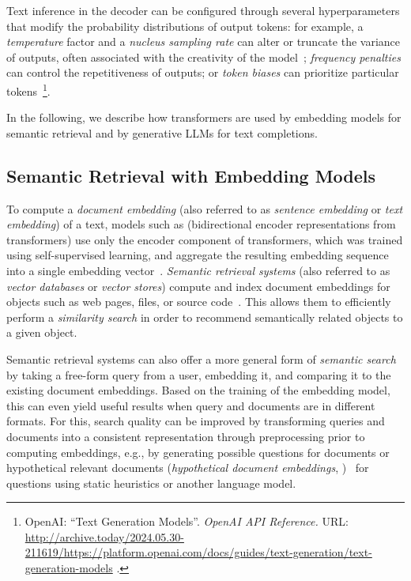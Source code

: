 \begin{description}[noextralabelsep]
	Text inference in the decoder can be configured through several hyperparameters that modify the probability distributions of output tokens:
	for example, a \emph{temperature} factor and a \emph{nucleus sampling rate} can alter or truncate the variance of outputs, often associated with the creativity of the model~\cite{holtzman2020curious}; \emph{frequency penalties} can control the repetitiveness of outputs; or \emph{token biases} can prioritize particular tokens~\footnote{
		OpenAI: ``Text Generation Models''. \emph{OpenAI API Reference.} URL:
		\url{http://archive.today/2024.05.30-211619/https://platform.openai.com/docs/guides/text-generation/text-generation-models}%
		.
	}.
\end{description}

In the following, we describe how transformers are used by embedding models for semantic retrieval and by generative LLMs for text completions.

\subsection*{Semantic Retrieval with Embedding Models}
\label{sec:background/semtec/retrieval}

To compute a \emph{document embedding} (also referred to as \emph{sentence embedding} or \emph{text embedding}) of a text, models such as  (bidirectional encoder representations from transformers) %
use only the encoder component of transformers, which was trained using self-supervised learning, and aggregate the resulting embedding sequence into a single embedding vector~\cite{devlin2019bert,raffel2023exploring}.
\emph{Semantic retrieval systems} (also referred to as \emph{vector databases} or \emph{vector stores}) compute and index document embeddings for objects such as web pages, files, or source code~\cite{lewis2020retrieval}.
This allows them to efficiently perform a \emph{similarity search} in order to recommend semantically related objects to a given object.

Semantic retrieval systems can also offer a more general form of \emph{semantic search} by taking a free-form query from a user, embedding it, and comparing it to the existing document embeddings.
Based on the training of the embedding model, this can even yield useful results when query and documents are in different formats.
For this, search quality can be improved by transforming queries and documents into a consistent representation through preprocessing prior to computing embeddings, e.g., by generating possible questions for documents or hypothetical relevant documents (\emph{hypothetical document embeddings}, )~\cite{mao2021generation,gao2022precise} for questions using static heuristics or another language model.


